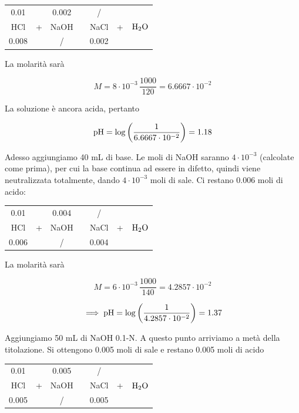 \begin{center}
    \begin{tabular}{ccccccc}
        0.01 &  & 0.002 & & / & &\\
        HCl & + & NaOH & \ce{->} & NaCl & + & $\rm H_2O$\\
        0.008 &  &  / & & 0.002 & &\\
    \end{tabular}
\end{center}

La molarità sarà

$$M=8\cdot 10^{-3} \, \frac{1000}{120}=6.6667 \cdot 10^{-2}$$

La soluzione è ancora acida, pertanto

$$\rm pH=\log\left( \frac{1}{6.6667 \cdot 10^{-2}} \right)=1.18$$

Adesso aggiungiamo 40 mL di base. Le moli di NaOH saranno $4 \cdot 10^{-3}$ (calcolate come prima), per cui la base continua ad essere in difetto, quindi viene neutralizzata totalmente, dando $4 \cdot 10^{-3}$ moli di sale. Ci restano 0.006 moli di acido:

\begin{center}
    \begin{tabular}{ccccccc}
        0.01 &  & 0.004 & & / & &\\
        HCl & + & NaOH & \ce{->} & NaCl & + & $\rm H_2O$\\
        0.006 &  &  / & & 0.004 & &\\
    \end{tabular}
\end{center}

La molarità sarà

$$M=6\cdot 10^{-3} \, \frac{1000}{140}=4.2857\cdot 10^{-2}$$

$$\implies \rm pH=\log\left( \frac{1}{4.2857 \cdot 10^{-2}} \right)=1.37$$

Aggiungiamo 50 mL di NaOH 0.1-N. A questo punto arriviamo a metà della titolazione. Si ottengono 0.005 moli di sale e restano 0.005 moli di acido

\begin{center}
    \begin{tabular}{ccccccc}
        0.01 &  & 0.005 & & / & &\\
        HCl & + & NaOH & \ce{->} & NaCl & + & $\rm H_2O$\\
        0.005 &  &  / & & 0.005 & &\\
    \end{tabular}
\end{center}

